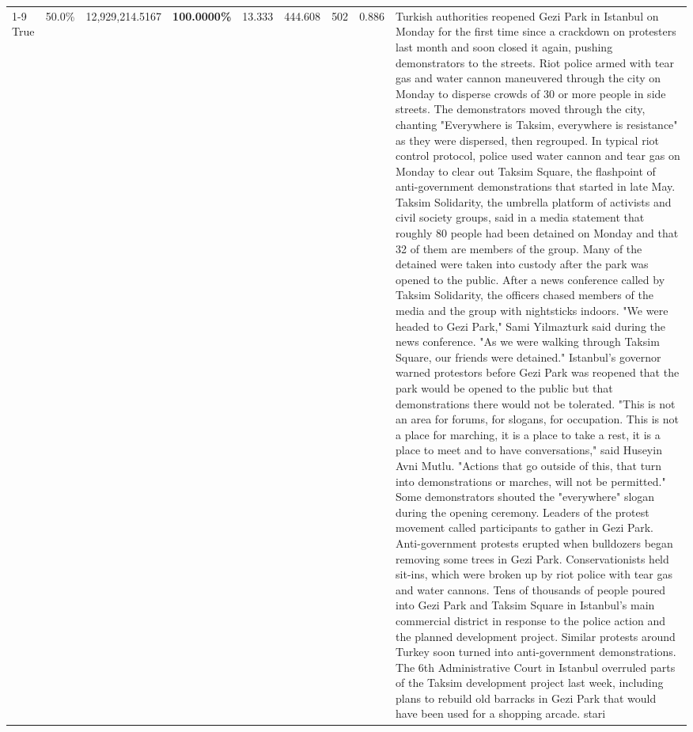 \begin{table}[H]
\begin{tabular}{lllrlllll}
\cline{1-9}
True & 50.0\% & 12,929,214.5167 & \bfseries \color{red} 100.0000\% & 13.333 & 444.608 & 502 & 0.886 & Turkish authorities reopened Gezi Park in Istanbul on Monday for the first time since a crackdown on protesters last month and soon closed it again, pushing demonstrators to the streets. Riot police armed with tear gas and water cannon maneuvered through the city on Monday to disperse crowds of 30 or more people in side streets. The demonstrators moved through the city, chanting "Everywhere is Taksim, everywhere is resistance" as they were dispersed, then regrouped. In typical riot control protocol, police used water cannon and tear gas on Monday to clear out Taksim Square, the flashpoint of anti-government demonstrations that started in late May. Taksim Solidarity, the umbrella platform of activists and civil society groups, said in a media statement that roughly 80 people had been detained on Monday and that 32 of them are members of the group. Many of the detained were taken into custody after the park was opened to the public. After a news conference called by Taksim Solidarity, the officers chased members of the media and the group with nightsticks indoors. "We were headed to Gezi Park," Sami Yilmazturk said during the news conference. "As we were walking through Taksim Square, our friends were detained." Istanbul's governor warned protestors before Gezi Park was reopened that the park would be opened to the public but that demonstrations there would not be tolerated. "This is not an area for forums, for slogans, for occupation. This is not a place for marching, it is a place to take a rest, it is a place to meet and to have conversations," said Huseyin Avni Mutlu. "Actions that go outside of this, that turn into demonstrations or marches, will not be permitted." Some demonstrators shouted the "everywhere" slogan during the opening ceremony. Leaders of the protest movement called participants to gather in Gezi Park. Anti-government protests erupted when bulldozers began removing some trees in Gezi Park. Conservationists held sit-ins, which were broken up by riot police with tear gas and water cannons. Tens of thousands of people poured into Gezi Park and Taksim Square in Istanbul's main commercial district in response to the police action and the planned development project. Similar protests around Turkey soon turned into anti-government demonstrations. The 6th Administrative Court in Istanbul overruled parts of the Taksim development project last week, including plans to rebuild old barracks in Gezi Park that would have been used for a shopping arcade. stari \\

\end{tabular}
\end{table}
